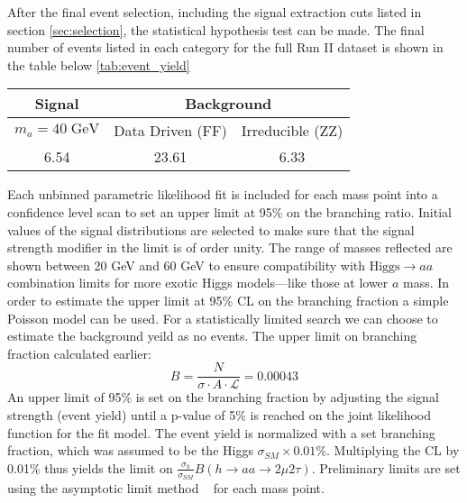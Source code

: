 

After the final event selection, including the signal extraction cuts listed in section \ref{sec:selection}, the statistical hypothesis test can be made. 
The final number of events listed in each category for the full Run II dataset is shown in the table below \ref{tab:event_yield}


\begin{table}[h!tbp]
\centering
{}
\begin{tabular*}{0.6\textwidth}{c|c|c}
\hline
Signal & \multicolumn{2}{c}{Background} \\
\hline $m_a=40\;\text{GeV}$ & Data Driven (FF) & Irreducible (ZZ)\\\hline
6.54   & 23.61 & 6.33 \\\hline
\end{tabular*}
\end{table}
 



Each unbinned parametric likelihood fit is included for each mass point into a confidence level scan to set an upper limit at 95\% on the branching ratio. Initial values of the signal distributions are selected to make sure that the signal strength modifier in the limit is of order unity. The range of masses reflected are shown between 20 GeV and 60 GeV to ensure compatibility with $\text{Higgs} \rightarrow a a $ combination limits for more exotic Higgs models---like those at lower $a$ mass. 
In order to estimate the upper limit at 95\% CL on the branching fraction a simple Poisson model can be used. For a statistically limited search we can choose to estimate the background yeild as no events. The upper limit on branching fraction calculated earlier: 
\begin{equation}B =  \frac{N}{\sigma \cdot A\cdot \mathcal{L}} = 0.00043\end{equation} 
An upper limit of 95\% is set on the branching fraction by adjusting the signal strength (event yield) until a p-value of 5\% is reached on the joint likelihood function for the fit model. 
The event yield is normalized with a set branching fraction, which was assumed to be the Higgs $\sigma_{SM} \times 0.01\%$.
Multiplying the CL by 0.01\% thus yields the limit on $\frac{\sigma_h}{\sigma_{SM}} B(h\rightarrow aa\rightarrow2\mu2\tau)$.
Preliminary limits are set using the asymptotic limit method ~\cite{Cowan_2011} for each mass point.


